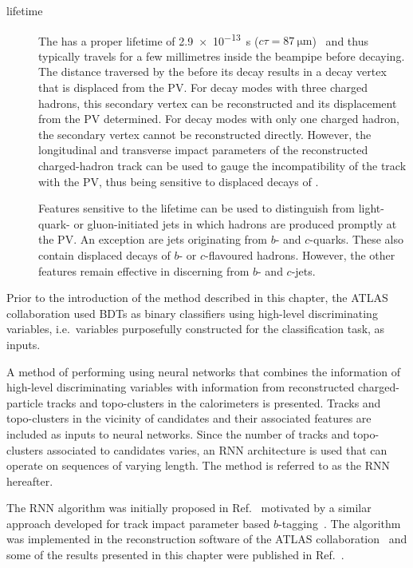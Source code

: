 \begin{description}
\item[\taulepton lifetime] The \taulepton has a proper lifetime of
  \SI{2.9e-13}{\second} ($c \tau = \SI{87}{\micro\metre}$)~\cite{pdg2020} and
  thus typically travels for a few millimetres inside the beampipe before
  decaying. The distance traversed by the \taulepton before its decay results in
  a decay vertex that is displaced from the PV. For \taulepton decay modes with
  three charged hadrons, this secondary vertex can be reconstructed and its
  displacement from the PV determined. For decay modes with only one charged
  hadron, the secondary vertex cannot be reconstructed directly. However, the
  longitudinal and transverse impact parameters of the reconstructed
  charged-hadron track can be used to gauge the incompatibility of the track
  with the PV, thus being sensitive to displaced decays of \tauleptons.

  Features sensitive to the \taulepton lifetime can be used to distinguish
  \tauhad from light-quark- or gluon-initiated jets in which hadrons are
  produced promptly at the PV. An exception are jets originating from $b$- and
  $c$-quarks. These also contain displaced decays of $b$- or $c$-flavoured
  hadrons. However, the other features remain effective in discerning \tauhad
  from $b$- and $c$-jets.

\end{description}
Prior to the introduction of the method described in this chapter, the
ATLAS collaboration used BDTs as binary classifiers using high-level
discriminating variables, i.e.\ variables purposefully constructed for
the classification task, as inputs.

A method of performing \tauid using neural networks that combines the
information of high-level discriminating variables with information from
reconstructed charged-particle tracks and topo-clusters in the calorimeters is
presented. Tracks and topo-clusters in the vicinity of \tauhadvis candidates and
their associated features are included as inputs to neural networks. Since the
number of tracks and topo-clusters associated to \tauhadvis candidates varies,
an RNN architecture is used that can operate on sequences of varying length. The
method is referred to as the RNN \tauid hereafter.

The RNN \tauid algorithm was initially proposed in Ref.~\cite{cdeutsch-master}
motivated by a similar approach developed for track impact parameter based
$b$-tagging~\cite{ATL-PHYS-PUB-2017-003}. The algorithm was implemented in the
reconstruction software of the ATLAS collaboration~\cite{ATL-SOFT-PUB-2021-001}
and some of the results presented in this chapter were published in
Ref.~\cite{ATL-PHYS-PUB-2019-033}.

